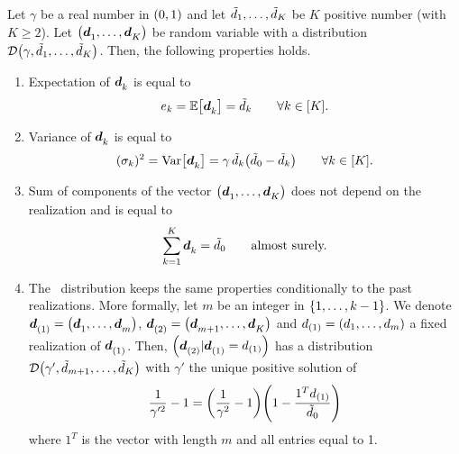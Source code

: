 \begin{prop}\label{prop:demand-distribution:properties}
Let $\gamma$ be a real number in $\bracket{0,1}$ and let $\tilde{d}_1,\ldots,\tilde{d}_K$ be $K$ positive number (with $K\ge2$).
Let $\bracket{\va\demand_1,\ldots,\va\demand_K}$ be random variable with a \distrib distribution $\cD\bracket{\gamma,\tilde{\demand}_1,\ldots,\tilde{\demand}_K}$.
Then, the following properties holds.
\begin{enumerate}
  \item\label{enum:PDP:random-demand-property:expectation}
  Expectation of $\va\demand_k$ is equal to
  \begin{equation}
    e_k = \espe\sqbracket{\va\demand_k} = \tilde{\demand}_k\qquad\forall k\in\range{K}.
  \end{equation}
  \item\label{enum:PDP:random-demand-property:variance}
  Variance of $\va\demand_k$ is equal to
  \begin{equation}\label{eq:PDP:numerical-experiments:demand:variance}
    (\sigma_k)^2=\vari\sqbracket{\va\demand_k}=\gamma\,\tilde{\demand}_k\bracket{\tilde{\demand}_0-\tilde{\demand}_k}\qquad\forall k\in\range{K}.
  \end{equation}
  \item\label{enum:PDP:random-demand-property:constant-volume}
  Sum of components of the vector $\bracket{\va\demand_1,\ldots,\va\demand_K}$ does not depend on the realization and is equal to
  \begin{equation}
    \sum_{k=1}^{K}\va\demand_k = \tilde{\demand}_0\qquad\mbox{almost surely.}
  \end{equation}
  \item\label{enum:PDP:random-demand-property:past-conditional}
  The \distrib\ distribution keeps the same properties conditionally to the past realizations.
  More formally, let $m$ be an integer in $\range[1]{k-1}$. We denote $\va\demand_{(1)}=\bracket{\va\demand_1,\ldots,\va\demand_m}$, $\va\demand_{(2)}=\bracket{\va\demand_{m+1},\ldots,\va\demand_K}$ and $\demand_{(1)}=\bracket{\demand_1,\ldots,\demand_m}$ a fixed realization of $\va\demand_{(1)}$.
  Then, $\bracket{\va\demand_{(2)}|\va\demand_{(1)}=\demand_{(1)}}$ has a \distrib distribution $\cD\bracket{\gamma',\tilde{\demand}_{m+1},\ldots,\tilde{\demand}_K}$
  with $\gamma'$ the unique positive solution of
  \begin{equation}\label{eq:PDP:random-demand-property:past-conditional:gamma}
    \frac{1}{\gamma'^2}-1 = \bracket{\frac{1}{\gamma^2}-1}\bracket{1-\frac{1^T\demand_{(1)}}{\tilde{\demand}_0}}
  \end{equation}
  where $1^T$ is the vector with length $m$ and all entries equal to 1. 
\end{enumerate}
\end{prop}


